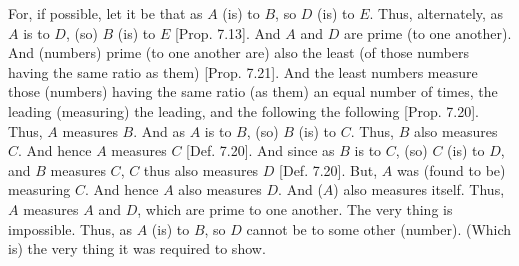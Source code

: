 \begin{Parallel}{}{}
{\epsfysize=1.3in
\centerline{}

For, if possible, let it be that as $A$ (is) to $B$, so $D$ (is) to $E$. 
Thus, alternately, as $A$ is to $D$, (so) $B$ (is) to $E$ [Prop. 7.13]. And $A$ and $D$ are prime (to one another).  And (numbers) prime (to one another are)
also the least (of those numbers having the same ratio as them) [Prop. 7.21]. And the least numbers measure those
(numbers) having the same ratio (as them) an equal number of times,
the leading (measuring) the leading, and the following the following [Prop. 7.20]. Thus, $A$ measures $B$. And as $A$
is to $B$, (so) $B$ (is) to $C$.  Thus, $B$ also measures $C$.  And hence
$A$ measures $C$ [Def. 7.20]. And since as $B$ is to
$C$, (so) $C$ (is) to $D$, and $B$ measures $C$, $C$ thus also measures
$D$ [Def. 7.20].  But, $A$ was (found to be) measuring $C$. And 
hence $A$ also measures $D$. And ($A$) also measures itself.  Thus, $A$
measures $A$ and $D$, which are prime to one another. The very thing is impossible. Thus, as $A$ (is) to $B$, so $D$ cannot be to some other (number). (Which is) the very thing it was required to show.}
\end{Parallel}

